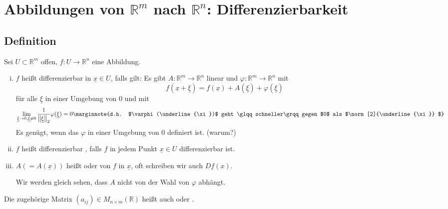 \section{Abbildungen von $\mathds{R}^m$ nach $\mathds{R}^n$: Differenzierbarkeit} %
\label{sec:7}

\subsection[Definition: Differenzierbarkeit, Differential, Jacobimatrix]{Definition} %
\label{sub:71}
Sei $U  \subset \mathds{R}^m$ offen, $f : U \to \mathds{R}^n$ eine Abbildung.
\begin{enumerate}[(i)]
	\item $f$ heißt differenzierbar in $\underline{x} \in U$, falls gilt: Es gibt $A : \mathds{R}^m \to \mathds{R}^n$ linear und $\varphi : \mathds{R}^m \to \mathds{R}^n$
	mit 
	\[
		\boxed{f(\underline{x} + \underline{\xi}) = f(\underline{x} ) + A (\underline{\xi}) + \varphi (\underline{\xi})} 
	\]
	für alle $\underline{\xi}$ in einer Umgebung von $0$ und mit
	\[
		\lim_{ \underline{\xi} \to 0, \underline{\xi} \not= 0} \frac{1}{\norm[2]{\underline{\xi}} } \varphi (\underline{\xi}) = 0
		 \marginnote{d.h. $\varphi (\underline{\xi})$ geht \glqq schneller\grqq gegen $0$ als $\norm[2]{\underline{\xi}} $}
	\]
	Es genügt, wenn das $\varphi$ in einer Umgebung von $0$ definiert ist. \hfill (warum?)
	\item $f$ heißt differenzierbar , falls $f$ in jedem Punkt $\underline{x} \in U$ differenzierbar ist.
	\item $A (= A(\underline{x}))$ heißt  oder  von $f$ in $\underline{x}$, oft schreiben wir auch $D f(x)$. 
	
	Wir werden gleich sehen, dass $A$ nicht von der Wahl von $\varphi$ abhängt.
\end{enumerate}
Die zugehörige Matrix $(a_{ij}) \in M_{n \times m}(\mathds{R})$ heißt auch  oder .  

